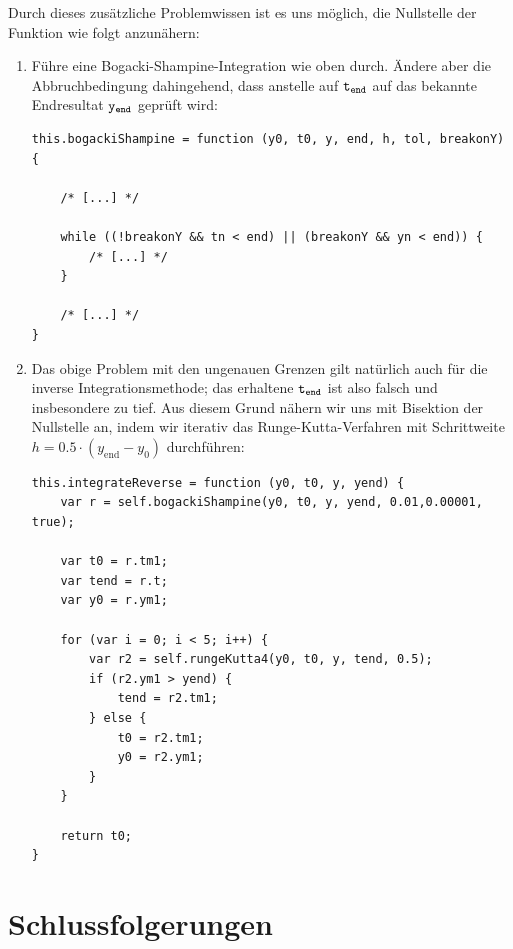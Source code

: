 \documentclass[11pt]{scrreprt} %
\theoremstyle{definition}
\begin{document}
Durch dieses zusätzliche Problemwissen ist es uns möglich, die Nullstelle der Funktion wie folgt anzunähern:
\begin{enumerate}
\item Führe eine Bogacki-Shampine-Integration wie oben durch. Ändere aber die Abbruchbedingung dahingehend, dass anstelle auf $\tt{t_{end}}$ auf das bekannte Endresultat $\tt{y_{end}}$ geprüft wird:

\begin{lstlisting}
this.bogackiShampine = function (y0, t0, y, end, h, tol, breakonY) {

	/* [...] */
		
	while ((!breakonY && tn < end) || (breakonY && yn < end)) {
		/* [...] */
	}

	/* [...] */
}
\end{lstlisting}

\item Das obige Problem mit den ungenauen Grenzen gilt natürlich auch für die inverse Integrationsmethode; das erhaltene $\tt{t_{end}}$ ist also falsch und insbesondere zu tief. Aus diesem Grund nähern wir uns mit Bisektion der Nullstelle an, indem wir iterativ das Runge-Kutta-Verfahren mit Schrittweite $h = 0.5\cdot(y_\text{end} - y_0)$ durchführen:

\begin{lstlisting}
this.integrateReverse = function (y0, t0, y, yend) {
	var r = self.bogackiShampine(y0, t0, y, yend, 0.01,0.00001, true);
		
	var t0 = r.tm1;
	var tend = r.t;
	var y0 = r.ym1;
		
	for (var i = 0; i < 5; i++) {
		var r2 = self.rungeKutta4(y0, t0, y, tend, 0.5);
		if (r2.ym1 > yend) {
			tend = r2.tm1;
		} else {
			t0 = r2.tm1;
			y0 = r2.ym1;
		}
	}

	return t0;
}
\end{lstlisting}

\end{enumerate}

\chapter{Schlussfolgerungen}



\end{document}
